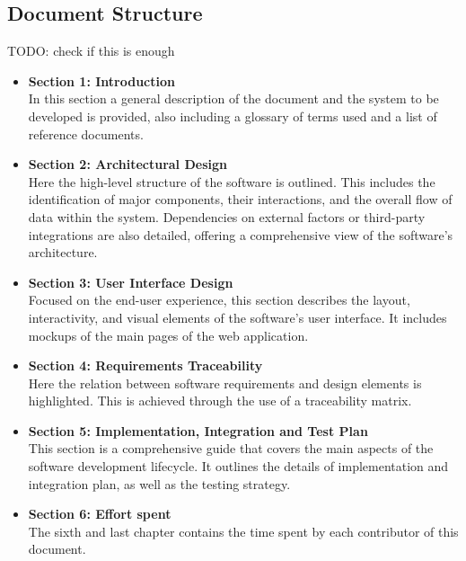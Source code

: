 \subsection{Document Structure}
TODO: check if this is enough
\begin{itemize}
    \item \textbf{Section 1: Introduction}\\ In this section a general description of the document and the system to be developed is provided, also including a glossary of terms used and a list of reference documents.
    \item \textbf{Section 2: Architectural Design}\\ Here the high-level structure of the software is outlined. This includes the identification of major components, their interactions, and the overall flow of data within the system. Dependencies on external factors or third-party integrations are also detailed, offering a comprehensive view of the software's architecture.
    \item \textbf{Section 3: User Interface Design}\\ Focused on the end-user experience, this section describes the layout, interactivity, and visual elements of the software's user interface. It includes mockups of the main pages of the web application.
    \item \textbf{Section 4: Requirements Traceability}\\ Here the relation between software requirements and design elements is highlighted. This is achieved through the use of a traceability matrix.
    \item \textbf{Section 5: Implementation, Integration and Test Plan}\\ This section is a comprehensive guide that covers the main aspects of the software development lifecycle. It outlines the details of implementation and integration plan, as well as the testing strategy.
    \item \textbf{Section 6: Effort spent}\\The sixth and last chapter contains the time spent by each contributor of this document.
\end{itemize}